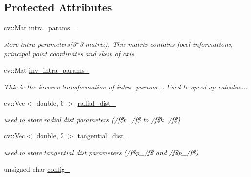 \subsection*{Protected Attributes}
\begin{DoxyCompactItemize}
\item 
\hypertarget{class_opencv_sf_m_1_1_camera_ab8ba859298ee9c13374477a99dd4241e}{
cv::Mat \hyperlink{class_opencv_sf_m_1_1_camera_ab8ba859298ee9c13374477a99dd4241e}{intra\_\-params\_\-}}
\label{class_opencv_sf_m_1_1_camera_ab8ba859298ee9c13374477a99dd4241e}

\begin{DoxyCompactList}\small\item\em store intra parameters(3$\ast$3 matrix). This matrix contains focal informations, principal point coordinates and skew of axis \end{DoxyCompactList}\item 
\hypertarget{class_opencv_sf_m_1_1_camera_a78c5473c4630de99d70d2d26d8321117}{
cv::Mat \hyperlink{class_opencv_sf_m_1_1_camera_a78c5473c4630de99d70d2d26d8321117}{inv\_\-intra\_\-params\_\-}}
\label{class_opencv_sf_m_1_1_camera_a78c5473c4630de99d70d2d26d8321117}

\begin{DoxyCompactList}\small\item\em This is the inverse transformation of intra\_\-params\_\-. Used to speed up calculus... \end{DoxyCompactList}\item 
\hypertarget{class_opencv_sf_m_1_1_camera_aa944a739f433b8fa984a963478f6d1f8}{
cv::Vec$<$ double, 6 $>$ \hyperlink{class_opencv_sf_m_1_1_camera_aa944a739f433b8fa984a963478f6d1f8}{radial\_\-dist\_\-}}
\label{class_opencv_sf_m_1_1_camera_aa944a739f433b8fa984a963478f6d1f8}

\begin{DoxyCompactList}\small\item\em used to store radial dist parameters (/f\$k\_/f\$ to /f\$k\_/f\$) \end{DoxyCompactList}\item 
\hypertarget{class_opencv_sf_m_1_1_camera_aca7121c3867cfd9af58c888b206581b9}{
cv::Vec$<$ double, 2 $>$ \hyperlink{class_opencv_sf_m_1_1_camera_aca7121c3867cfd9af58c888b206581b9}{tangential\_\-dist\_\-}}
\label{class_opencv_sf_m_1_1_camera_aca7121c3867cfd9af58c888b206581b9}

\begin{DoxyCompactList}\small\item\em used to store tangential dist parameters (/f\$p\_/f\$ and /f\$p\_/f\$) \end{DoxyCompactList}\item 
\hypertarget{class_opencv_sf_m_1_1_camera_a8d0f1e2b2467b256b34fee4a5df31e4d}{
unsigned char \hyperlink{class_opencv_sf_m_1_1_camera_a8d0f1e2b2467b256b34fee4a5df31e4d}{config\_\-}}
\label{class_opencv_sf_m_1_1_camera_a8d0f1e2b2467b256b34fee4a5df31e4d}


\end{DoxyCompactItemize}
